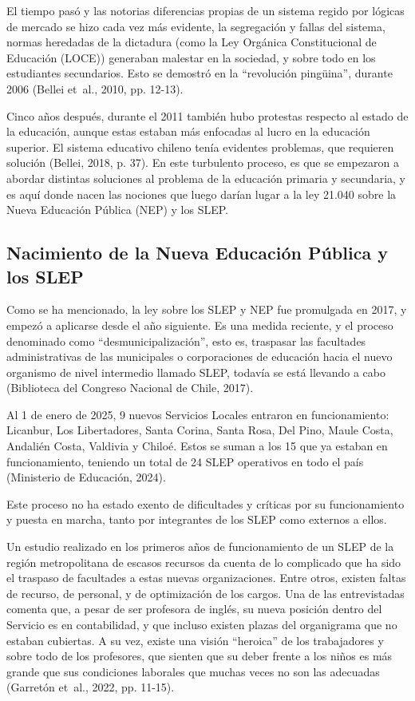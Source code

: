 \documentclass[
  12pt,
  letterpaper,
]{article}
\begin{document}
El tiempo pasó y las notorias diferencias propias de un sistema regido por lógicas de mercado se hizo cada vez más evidente, la segregación y fallas del sistema, normas heredadas de la dictadura (como la Ley Orgánica Constitucional de Educación (LOCE)) generaban malestar en la sociedad, y sobre todo en los estudiantes secundarios.
Esto se demostró en la ``revolución pingüina'', durante 2006 (Bellei et~al., 2010, pp. 12-13).

Cinco años después, durante el 2011 también hubo protestas respecto al estado de la educación, aunque estas estaban más enfocadas al lucro en la educación superior.
El sistema educativo chileno tenía evidentes problemas, que requieren solución (Bellei, 2018, p. 37).
En este turbulento proceso, es que se empezaron a abordar distintas soluciones al problema de la educación primaria y secundaria, y es aquí donde nacen las nociones que luego darían lugar a la ley 21.040 sobre la Nueva Educación Pública (NEP) y los SLEP.

\subsection{Nacimiento de la Nueva Educación Pública y los SLEP}\label{nacimiento-de-la-nueva-educaciuxf3n-puxfablica-y-los-slep}

Como se ha mencionado, la ley sobre los SLEP y NEP fue promulgada en 2017, y empezó a aplicarse desde el año siguiente.
Es una medida reciente, y el proceso denominado como ``desmunicipalización'', esto es, traspasar las facultades administrativas de las municipales o corporaciones de educación hacia el nuevo organismo de nivel intermedio llamado SLEP, todavía se está llevando a cabo (Biblioteca del Congreso Nacional de Chile, 2017).

Al 1 de enero de 2025, 9 nuevos Servicios Locales entraron en funcionamiento: Licanbur, Los Libertadores, Santa Corina, Santa Rosa, Del Pino, Maule Costa, Andalién Costa, Valdivia y Chiloé.
Estos se suman a los 15 que ya estaban en funcionamiento, teniendo un total de 24 SLEP operativos en todo el país (Ministerio de Educación, 2024).

Este proceso no ha estado exento de dificultades y críticas por su funcionamiento y puesta en marcha, tanto por integrantes de los SLEP como externos a ellos.

Un estudio realizado en los primeros años de funcionamiento de un SLEP de la región metropolitana de escasos recursos da cuenta de lo complicado que ha sido el traspaso de facultades a estas nuevas organizaciones.
Entre otros, existen faltas de recurso, de personal, y de optimización de los cargos.
Una de las entrevistadas comenta que, a pesar de ser profesora de inglés, su nueva posición dentro del Servicio es en contabilidad, y que incluso existen plazas del organigrama que no estaban cubiertas.
A su vez, existe una visión ``heroica'' de los trabajadores y sobre todo de los profesores, que sienten que su deber frente a los niños es más grande que sus condiciones laborales que muchas veces no son las adecuadas (Garretón et~al., 2022, pp. 11-15).
\end{document}
